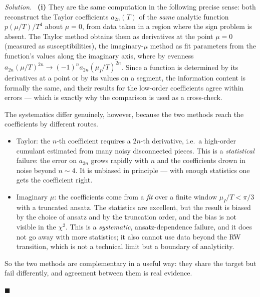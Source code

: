 \documentclass[11pt]{article}
\newenvironment{solution}{\par\smallskip\noindent\textit{Solution.}\ }{\hfill$\blacksquare$\par\smallskip}
\begin{document}
\begin{solution}
\textbf{(i)} They are the same computation in the following precise sense: both reconstruct the Taylor coefficients $a_{2n}(T)$ of the \emph{same} analytic function $p(\mu/T)/T^4$ about $\mu = 0$, from data taken in a region where the sign problem is absent. The Taylor method obtains them as derivatives at the point $\mu = 0$ (measured as susceptibilities), the imaginary-$\mu$ method as fit parameters from the function's values along the imaginary axis, where by evenness $a_{2n}(\mu/T)^{2n} \to (-1)^n a_{2n}(\mu_I/T)^{2n}$. Since a function is determined by its derivatives at a point or by its values on a segment, the information content is formally the same, and their results for the low-order coefficients agree within errors --- which is exactly why the comparison is used as a cross-check.

The systematics differ genuinely, however, because the two methods reach the coefficients by different routes.
\begin{itemize}
  \item Taylor: the $n$-th coefficient requires a $2n$-th derivative, i.e.\ a high-order cumulant estimated from many noisy disconnected pieces. This is a \emph{statistical} failure: the error on $a_{2n}$ grows rapidly with $n$ and the coefficients drown in noise beyond $n\sim4$. It is unbiased in principle --- with enough statistics one gets the coefficient right.
  \item Imaginary $\mu$: the coefficients come from a \emph{fit} over a finite window $\mu_I/T < \pi/3$ with a truncated ansatz. The statistics are excellent, but the result is biased by the choice of ansatz and by the truncation order, and the bias is not visible in the $\chi^2$. This is a \emph{systematic}, ansatz-dependence failure, and it does not go away with more statistics; it also cannot use data beyond the RW transition, which is not a technical limit but a boundary of analyticity.
\end{itemize}
So the two methods are complementary in a useful way: they share the target but fail differently, and agreement between them is real evidence.


\end{solution}
\end{document}
